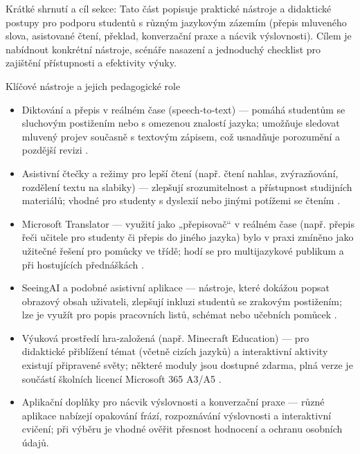 Krátké shrnutí a cíl sekce: Tato část popisuje praktické nástroje a didaktické postupy pro podporu studentů s různým jazykovým zázemím (přepis mluveného slova, asistované čtení, překlad, konverzační praxe a nácvik výslovnosti). Cílem je nabídnout konkrétní nástroje, scénáře nasazení a jednoduchý checklist pro zajištění přístupnosti a efektivity výuky.

Klíčové nástroje a jejich pedagogické role
\begin{itemize}
  \item Diktování a přepis v reálném čase (speech‑to‑text) — pomáhá studentům se sluchovým postižením nebo s omezenou znalostí jazyka; umožňuje sledovat mluvený projev současně s textovým zápisem, což usnadňuje porozumění a pozdější revizi \cite{kb_ai_101_tipu_pdf_04e4a115_page_11_1}.
  \item Asistivní čtečky a režimy pro lepší čtení (např. čtení nahlas, zvýrazňování, rozdělení textu na slabiky) — zlepšují srozumitelnost a přístupnost studijních materiálů; vhodné pro studenty s dyslexií nebo jinými potížemi se čtením \cite{kb_ai_101_tipu_pdf_04e4a115_page_11_1}.
  \item Microsoft Translator — využití jako „přepisovač“ v reálném čase (např. přepis řeči učitele pro studenty či přepis do jiného jazyka) bylo v praxi zmíněno jako užitečné řešení pro pomůcky ve třídě; hodí se pro multijazykové publikum a při hostujících přednáškách \cite{kb_ai_101_tipu_pdf_04e4a115_page_11_1}.
  \item SeeingAI a podobné asistivní aplikace — nástroje, které dokážou popsat obrazový obsah uživateli, zlepšují inkluzi studentů se zrakovým postižením; lze je využít pro popis pracovních listů, schémat nebo učebních pomůcek \cite{kb_ai_101_tipu_pdf_04e4a115_page_11_1}.
  \item Výuková prostředí hra‑založená (např. Minecraft Education) — pro didaktické přiblížení témat (včetně cizích jazyků) a interaktivní aktivity existují připravené světy; některé moduly jsou dostupné zdarma, plná verze je součástí školních licencí Microsoft 365 A3/A5 \cite{kb_ai_101_tipu_pdf_04e4a115_page_15_2}.
  \item Aplikační doplňky pro nácvik výslovnosti a konverzační praxe — různé aplikace nabízejí opakování frází, rozpoznávání výslovnosti a interaktivní cvičení; při výběru je vhodné ověřit přesnost hodnocení a ochranu osobních údajů.
\end{itemize}

